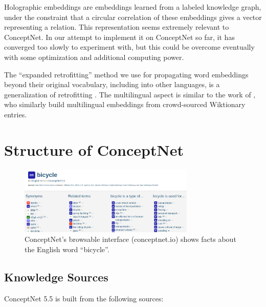 \documentclass[letterpaper]{article}
\begin{document}
Holographic embeddings \cite{nickel2015holographic} are embeddings learned from
a labeled knowledge graph, under the constraint that a circular correlation of
these embeddings gives a vector representing a relation. This representation
seems extremely relevant to ConceptNet. In our attempt to implement it on
ConceptNet so far, it has converged too slowly to experiment with, but this
could be overcome eventually with some optimization and additional computing
power.

The ``expanded retrofitting'' method we use for propagating word embeddings
beyond their original vocabulary, including into other languages, is a
generalization of retrofitting \cite{faruqui2015retrofitting}. The multilingual
aspect is similar to the work of \citeauthor{xiao2014distributed}
, who similarly build multilingual embeddings
from crowd-sourced Wiktionary entries.

\section{Structure of ConceptNet}\label{structure-of-conceptnet}

\begin{figure}[t]
\centering
\includegraphics[width=3.3in]{cn5-screenshot.png}
\caption{
    ConceptNet's browsable interface (conceptnet.io) shows
    facts about the English word ``bicycle''.
}
\label{screenshot}
\end{figure}

\subsection{Knowledge Sources}\label{knowledge-sources}

ConceptNet 5.5 is built from the following sources:
\end{document}

